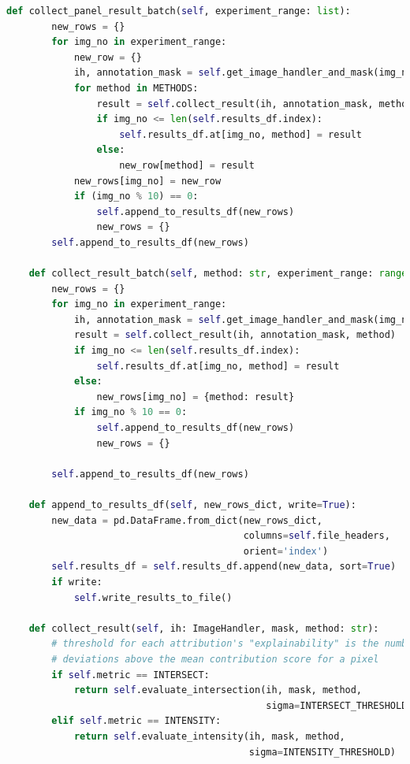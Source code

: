 \documentclass[main]{subfiles}
\begin{document}
\begin{lstlisting}[language=Python,basicstyle=\scriptsize]
    def collect_panel_result_batch(self, experiment_range: list):
        new_rows = {}
        for img_no in experiment_range:
            new_row = {}
            ih, annotation_mask = self.get_image_handler_and_mask(img_no)
            for method in METHODS:
                result = self.collect_result(ih, annotation_mask, method)
                if img_no <= len(self.results_df.index):
                    self.results_df.at[img_no, method] = result
                else:
                    new_row[method] = result
            new_rows[img_no] = new_row
            if (img_no % 10) == 0:
                self.append_to_results_df(new_rows)
                new_rows = {}
        self.append_to_results_df(new_rows)

    def collect_result_batch(self, method: str, experiment_range: range):
        new_rows = {}
        for img_no in experiment_range:
            ih, annotation_mask = self.get_image_handler_and_mask(img_no)
            result = self.collect_result(ih, annotation_mask, method)
            if img_no <= len(self.results_df.index):
                self.results_df.at[img_no, method] = result
            else:
                new_rows[img_no] = {method: result}
            if img_no % 10 == 0:
                self.append_to_results_df(new_rows)
                new_rows = {}

        self.append_to_results_df(new_rows)

    def append_to_results_df(self, new_rows_dict, write=True):
        new_data = pd.DataFrame.from_dict(new_rows_dict, 
                                          columns=self.file_headers, 
                                          orient='index')
        self.results_df = self.results_df.append(new_data, sort=True)
        if write:
            self.write_results_to_file()

    def collect_result(self, ih: ImageHandler, mask, method: str):
        # threshold for each attribution's "explainability" is the number of std 
        # deviations above the mean contribution score for a pixel
        if self.metric == INTERSECT:
            return self.evaluate_intersection(ih, mask, method, 
                                              sigma=INTERSECT_THRESHOLD)
        elif self.metric == INTENSITY:
            return self.evaluate_intensity(ih, mask, method, 
                                           sigma=INTENSITY_THRESHOLD)


\end{lstlisting}
\end{document}
